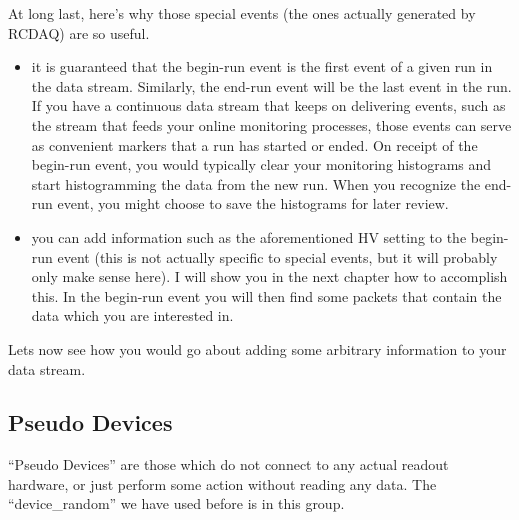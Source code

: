\documentclass{article}[11pt]
\begin{document}
At long last, here's why those special events (the ones
actually generated by RCDAQ) are so useful.

\begin{itemize}
\item it is guaranteed that the begin-run event is the first event of
  a given run in the data stream. Similarly, the end-run event will be
  the last event in the run. If you have a continuous data stream that
  keeps on delivering events, such as the stream that feeds your
  online monitoring processes, those events can serve as convenient
  markers that a run has started or ended. On receipt of the begin-run
  event, you would typically clear your monitoring histograms and start
  histogramming the data from the new run. When you recognize the
  end-run event, you might choose to save the histograms for later
  review.

\item you can add information such as the aforementioned HV setting to
  the begin-run event (this is not actually specific to special
  events, but it will probably only make sense here). I will show you
  in the next chapter how to accomplish this. In the begin-run event
  you will then find some packets that contain the data which you are
  interested in.

\end{itemize}

Lets now see how you would go about adding some arbitrary information to your data 
stream.

\subsection{Pseudo Devices}

``Pseudo Devices'' are those which do not connect to any actual
readout hardware, or just perform some action without reading any
data.  The ``device\_random'' we have used before is in this group.
\end{document}
